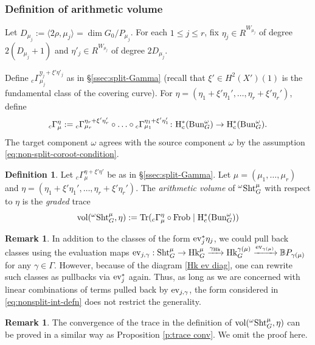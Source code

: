 \documentclass[reqno]{amsart}
\numberwithin{equation}{subsection}
\theoremstyle{definition}
\newtheorem{defn}[subsubsection]{Definition}
\newtheorem{remark}[subsubsection]{Remark}
\def\BB{\mathbb{B}}
\newcommand{\Bun}{\textup{Bun}}
\newcommand\ev{\textup{ev}}
\newcommand\Frob{\textup{Frob}}
\newcommand\Hk{\mathrm{Hk}}
\newcommand\Sht{\textup{Sht}}
\newcommand{\Tr}{\textup{Tr}}
\newcommand{\vol}{\textup{vol}}
\renewcommand{\j}[1]{\langle{#1}\rangle}
\newcommand\xr{\xrightarrow}
\newcommand\g\gamma
\newcommand\G\Gamma
\renewcommand\r\rho
\newcommand{\y}{\eta}
\newcommand{\om}{\omega}
\newcommand{\co}{\colon}
\newcommand{\rH}{\ensuremath{\mathrm{H}}\xspace}
\begin{document}
\subsubsection{Definition of arithmetic volume}

Let $D_{\mu_j}:=\j{2\r,\mu_j}=\dim G_{0}/P_{\mu_j}$. For each $1\le j\le r$, fix $\y_{j}\in R^{W_{\mu_j}}$ of degree $2(D_{\mu_j}+1)$ and $\y'_{j}\in R^{W_{\mu_j}}$ of degree $2D_{\mu_j}$.

Define ${}_{c}\Gamma^{ \eta_j + \xi' \eta'_j}_{ \mu_j}$ as in \S \ref{ssec:split-Gamma} (recall that $\xi' \in H^2(X')(1)$ is the fundamental class of the covering curve). For $\eta = (\eta_1 + \xi' \eta_1', \ldots, \eta_r + \xi' \eta_r')$, define
\[
{}_{c}\Gamma^{ \eta}_{ \mu} := {}_{c}\Gamma^{ \eta_r + \xi' \eta'_r}_{ \mu_r} \circ \ldots \circ {}_{c}\Gamma^{ \eta_1 + \xi' \eta'_1}_{ \mu_1} \co \rH^*_c(\Bun_G^\omega) \rightarrow \rH^*_c(\Bun_G^\omega). 
\]
The target component $\omega$ agrees with the source component $\omega$ by the assumption \eqref{eq:non-split-coroot-condition}.

\begin{defn}
Let ${}_{c}\Gamma^{ \eta + \xi' \eta'}_{ \mu}$ be as in \S \ref{ssec:split-Gamma}. Let $\mu = (\mu_1, \ldots, \mu_r)$ and $\eta = (\eta_1 + \xi' \eta_1', \ldots, \eta_r + \xi' \eta_r')$. The \emph{arithmetic volume} of ${}^{\om}\Sht^{\mu}_{G}$ with respect to $\eta$ is the \emph{graded} trace
\begin{equation}\label{eq:nonsplit-int-defn}
\vol({}^{\om}\Sht^{\mu}_{G}, \eta) := \Tr(
{}_{c}\Gamma^{ \eta}_{ \mu}\circ\Frob  \mid \rH_c^*(\Bun_G^\omega))
\end{equation}
\end{defn}

\begin{remark} In addition to the classes of the form $\ev_{j}^{*}\y_{j}$, we could pull back classes using the evaluation maps $\ev_{j, \g}: \Sht^{\mu}_{G}\to \Hk^{\mu}_G\xr{\g_{\Hk}}\Hk^{\g(\mu)}_G \xr{\ev_{\g(\mu)}} \BB P_{\g(\mu)}$ for any $\g\in \G$. However, because of the diagram \eqref{Hk ev diag}, one can rewrite such classes as pullbacks via $\ev_{j}^{*}$ again. Thus, as long as we are concerned with linear combinations of  terms pulled back by $\ev_{j, \g}$, the form considered in \eqref{eq:nonsplit-int-defn} does not restrict the generality.
\end{remark}

\begin{remark}
    The convergence of the trace in the definition of $\vol({}^{\om}\Sht^{\mu}_{G}, \eta)$ can be proved in a similar way as Proposition \ref{p:trace conv}. We omit the proof here.
\end{remark}
\end{document}
